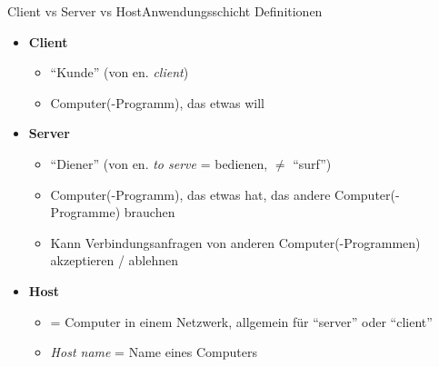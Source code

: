 \begin{frame}[fragile]{\faLaptop{} Client vs Server vs Host}{Anwendungsschicht}
    Definitionen
    \begin{itemize}[<+->]
        \item \textbf{Client}
              \begin{itemize}
                  \item \enquote{Kunde} (von en. \textit{client})
                  \item Computer(-Programm), das etwas will
              \end{itemize}
        \item \textbf{Server}
              \begin{itemize}
                  \item \enquote{Diener} (von en. \textit{to serve} = bedienen, $\neq$ \enquote{surf})
                  \item Computer(-Programm), das etwas hat, das andere Computer(-Programme) brauchen
                  \item Kann Verbindungsanfragen von anderen Computer(-Programmen) akzeptieren / ablehnen
              \end{itemize}
        \item \textbf{Host}
              \begin{itemize}
                  \item = Computer in einem Netzwerk, allgemein für \enquote{server} oder \enquote{client}
                  \item \textit{Host name} = Name eines Computers
              \end{itemize}

    \end{itemize}
\end{frame}

